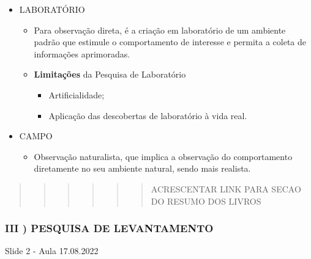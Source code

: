 \documentclass[
]{book}
\providecommand{\tightlist}{%
  \setlength{\itemsep}{0pt}\setlength{\parskip}{0pt}}
\begin{document}
\begin{itemize}
\tightlist
\item
  LABORATÓRIO

  \begin{itemize}
  \tightlist
  \item
    Para observação direta, é a criação em laboratório de um ambiente padrão que estimule o comportamento de interesse e permita a coleta de informações aprimoradas.
  \item
    \textbf{Limitações} da Pesquisa de Laboratório

    \begin{itemize}
    \tightlist
    \item
      Artificialidade;
    \item
      Aplicação das descobertas de laboratório à vida real.
    \end{itemize}
  \end{itemize}
\item
  CAMPO

  \begin{itemize}
  \tightlist
  \item
    Observação naturalista, que implica a observação do comportamento diretamente no seu ambiente natural, sendo mais realista.
  \end{itemize}
\end{itemize}

\begin{quote}
\begin{quote}
\begin{quote}
\begin{quote}
\begin{quote}
\begin{quote}
ACRESCENTAR LINK PARA SECAO DO RESUMO DOS LIVROS
\end{quote}
\end{quote}
\end{quote}
\end{quote}
\end{quote}
\end{quote}

\hypertarget{iii-pesquisa-de-levantamento}{%
\subsubsection{III ) PESQUISA DE LEVANTAMENTO}\label{iii-pesquisa-de-levantamento}}

Slide 2 - Aula 17.08.2022
\end{document}
